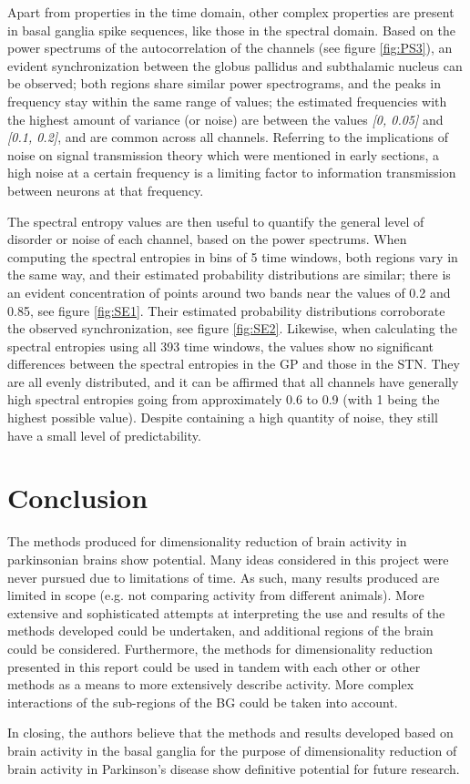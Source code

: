\documentclass{kththesis}
\begin{document}
Apart from properties in the time domain, other complex properties are present in basal ganglia spike sequences, like those in the spectral domain. 
Based on the power spectrums of the autocorrelation of the channels (see figure \ref{fig:PS3}), an evident synchronization between the globus pallidus and subthalamic nucleus can be observed; both regions share similar power spectrograms, and the peaks in frequency stay within the same range of values; the estimated frequencies with the highest amount of variance (or noise) are between the values \textit{[0, 0.05]} and \textit{[0.1, 0.2]}, and are common across all channels. 
Referring to the implications of noise on signal transmission theory which were mentioned in early sections, a high noise at a certain frequency is a limiting factor to information transmission between neurons at that frequency. 

The spectral entropy values are then useful to quantify the general level of disorder or noise of each channel, based on the power spectrums. 
When computing the spectral entropies in bins of 5 time windows, both regions vary in the same way, and their estimated probability distributions are similar; there is an evident concentration of points around two bands near the values of 0.2 and 0.85, see figure \ref{fig:SE1}.
Their estimated probability distributions corroborate the observed synchronization, see figure \ref{fig:SE2}. 
Likewise, when calculating the spectral entropies using all 393 time windows, the values show no significant differences between the spectral entropies in the GP and those in the STN. 
They are all evenly distributed, and it can be affirmed that all channels have generally high spectral entropies going from approximately 0.6 to 0.9 (with 1 being the highest possible value). 
Despite containing a high quantity of noise, they still have a small level of predictability. 

\newpage
\chapter{Conclusion}

The methods produced for dimensionality reduction of brain activity in parkinsonian brains show potential.
Many ideas considered in this project were never pursued due to limitations of time. 
As such, many results produced are limited in scope (e.g. not comparing activity from different animals).
More extensive and sophisticated attempts at interpreting the use and results of the methods developed could be undertaken, and additional regions of the brain could be considered.
Furthermore, the methods for dimensionality reduction presented in this report could be used in tandem with each other or other methods as a means to more extensively describe activity.
More complex interactions of the sub-regions of the BG could be taken into account.

In closing, the authors believe that the methods and results developed based on brain activity in the basal ganglia for the purpose of dimensionality reduction of brain activity in Parkinson's disease show definitive potential for future research.

\newpage
\printbibliography[heading=bibintoc]
\end{document}
